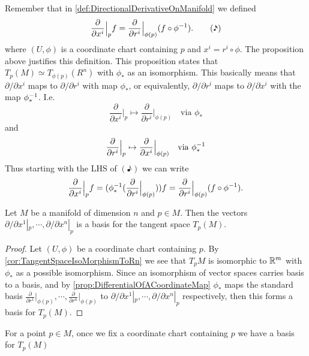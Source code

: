\begin{remark}
	\label{remark:differentialOfCoordinateMapActingOnBases}
	Remember that in \autoref{def:DirectionalDerivativeOnManifold} we defined
	\[ \frac{\partial}{\partial  x^i}\big|_{p} f = \frac{\partial}{\partial  r^i}\big|_{\phi(p)}(f\circ\phi^{-1}).\tag{\eighthnote} \]
	where $ (U,\phi) $ is a coordinate chart containing $ p $ and $ x^i = r^i \circ \phi $. The proposition above justifies this definition. This proposition states that $ T_p(M) \simeq T_{\phi(p)}(R^n) $ with $ \phi_* $ as an isomorphism. This basically means that $ \partial/\partial x^i $ maps to $ \partial/\partial r^i $ with map $ \phi_* $, or equivalently,  $ \partial/\partial r^i $ maps to $ \partial/\partial x^i $ with the map $ \phi^{-1}_* $. I.e.
	\[ \frac{\partial}{\partial  x^i}\big|_{p} \mapsto \frac{\partial}{\partial  r^i}\big|_{\phi(p)} \quad\text{via } \phi_* \]
	and 
	\[ \frac{\partial}{\partial  r^i}\big|_{p} \mapsto \frac{\partial}{\partial  x^i}\big|_{\phi(p)} \quad\text{via } \phi^{-1}_* \]
	Thus starting with the LHS of $ (\eighthnote) $ we can write
	\[ \frac{\partial}{\partial  x^i}\big|_{p}f = (\phi^{-1}_*(\frac{\partial}{\partial  r^i}\big|_{\phi(p)}))f = \frac{\partial}{\partial  r^i}\big|_{\phi(p)}(f\circ \phi^{-1}).  \]
\end{remark}


\begin{proposition}
	\label{prop:BasisForTangetSpace}
	Let $ M $ be a manifold of dimension $ n $ and $ p \in M $. Then the vectors $ \partial/\partial x^1|_p,\cdots, \partial/\partial x^n|_p $ is a basis for the tangent space $ T_p(M) $.
\end{proposition}
\begin{proof}
	Let $ (U,\phi) $ be a coordinate chart containing $ p $. By \autoref{cor:TangentSpaceIsoMorphismToRn} we see that $ T_pM $ is isomorphic to $ \mathbb{R}^m $ with $ \phi_* $ as a possible isomorphism. Since an isomorphism of vector spaces carries basis to a basis, and by \autoref{prop:DifferentialOfACoordinateMap} $ \phi_* $ maps the standard basis $ \frac{\partial}{\partial  r^1}\big|_{\phi(p)},\cdots,\frac{\partial}{\partial  r^n}\big|_{\phi(p)} $ to $ \partial/\partial x^1|_p,\cdots, \partial/\partial x^n|_p $ respectively, then this forms a basis for $ T_p(M) $.
\end{proof}

\begin{remark}
	For a point $ p \in M $, once we fix a coordinate chart containing $ p $ we have a basis for $ T_p(M) $
\end{remark}


